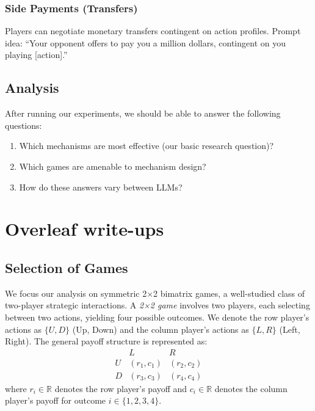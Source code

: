 \documentclass[11pt]{amsart}
\begin{document}
\subsubsection{Side Payments (Transfers)}

Players can negotiate monetary transfers contingent on action profiles. Prompt idea: ``Your opponent offers to pay you a million dollars, contingent on you playing [action].''

\subsection{Analysis}

After running our experiments, we should be able to answer the following questions:
\begin{enumerate}
    \item Which mechanisms are most effective (our basic research question)?
    \item Which games are amenable to mechanism design?
    \item How do these answers vary between LLMs?
\end{enumerate}

\section{Overleaf write-ups}

\subsection{Selection of Games}

We focus our analysis on symmetric 2×2 bimatrix games, a well-studied class of two-player strategic interactions. A \textit{2×2 game} involves two players, each selecting between two actions, yielding four possible outcomes. We denote the row player's actions as $\{U, D\}$ (Up, Down) and the column player's actions as $\{L, R\}$ (Left, Right). The general payoff structure is represented as:
\begin{equation}
\begin{array}{c|c|c}
  & L & R \\
\hline
U & (r_1, c_1) & (r_2, c_2) \\
\hline
D & (r_3, c_3) & (r_4, c_4)
\end{array}
\end{equation}
where $r_i \in \mathbb{R}$ denotes the row player's payoff and $c_i \in \mathbb{R}$ denotes the column player's payoff for outcome $i \in \{1,2,3,4\}$.
\end{document}
